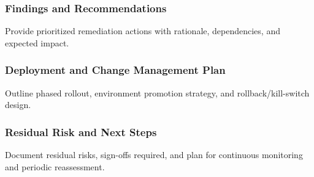 \subsubsection{Findings and Recommendations}
Provide prioritized remediation actions with rationale, dependencies, and expected impact.

\subsubsection{Deployment and Change Management Plan}
Outline phased rollout, environment promotion strategy, and rollback/kill-switch design.

\subsubsection{Residual Risk and Next Steps}
Document residual risks, sign-offs required, and plan for continuous monitoring and periodic reassessment.


